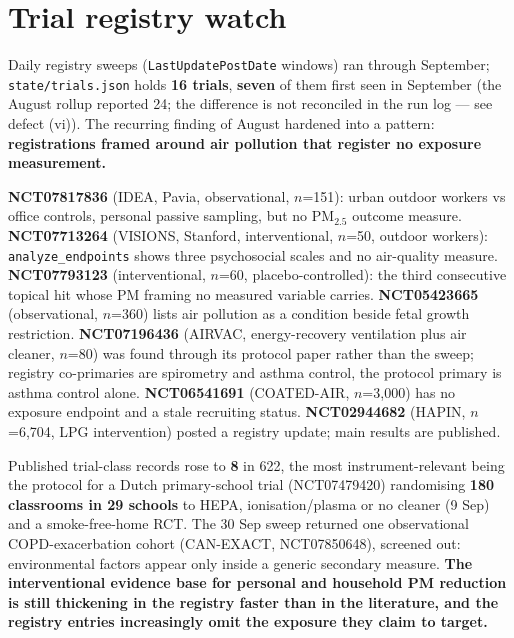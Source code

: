 \documentclass[10pt]{article}
\begin{document}
\clearpage

\section*{\sffamily\bfseries\color{Deep}Trial registry watch}
\vspace{-1.5mm}{\color{Coral}\rule{\linewidth}{1.1pt}}\vspace{2.5mm}

\footnotesize
Daily registry sweeps (\texttt{LastUpdatePostDate} windows) ran through September; \texttt{state/trials.json} holds
\textbf{16 trials}, \textbf{seven} of them first seen in September (the August rollup reported 24; the
difference is not reconciled in the run log --- see defect (vi)). The recurring finding of August hardened into a pattern: \textbf{registrations framed
around air pollution that register no exposure measurement.}

\vspace{1.5mm}
\textbf{NCT07817836} (IDEA, Pavia, observational, $n$=151): urban outdoor workers vs office controls,
personal passive sampling, but no PM$_{2.5}$ outcome measure. \textbf{NCT07713264} (VISIONS, Stanford,
interventional, $n$=50, outdoor workers): \texttt{analyze\_endpoints} shows three psychosocial scales
and no air-quality measure. \textbf{NCT07793123} (interventional, $n$=60, placebo-controlled): the
third consecutive topical hit whose PM framing no measured variable carries. \textbf{NCT05423665}
(observational, $n$=360) lists air pollution as a condition beside fetal growth restriction.
\textbf{NCT07196436} (AIRVAC, energy-recovery ventilation plus air cleaner, $n$=80) was found through
its protocol paper rather than the sweep; registry co-primaries are spirometry and asthma control,
the protocol primary is asthma control alone. \textbf{NCT06541691} (COATED-AIR, $n$=3,000) has no
exposure endpoint and a stale recruiting status. \textbf{NCT02944682} (HAPIN, $n$=6,704, LPG
intervention) posted a registry update; main results are published.

\vspace{1.5mm}
Published trial-class records rose to \textbf{8} in 622, the most instrument-relevant being the
protocol for a Dutch primary-school trial (NCT07479420) randomising \textbf{180 classrooms in 29
schools} to HEPA, ionisation/plasma or no cleaner (9 Sep) and a smoke-free-home RCT. The 30 Sep
sweep returned one observational COPD-exacerbation cohort (CAN-EXACT, NCT07850648), screened out:
environmental factors appear only inside a generic secondary measure. \textbf{The interventional
evidence base for personal and household PM reduction is still thickening in the registry faster
than in the literature, and the registry entries increasingly omit the exposure they claim to
target.}
\end{document}
